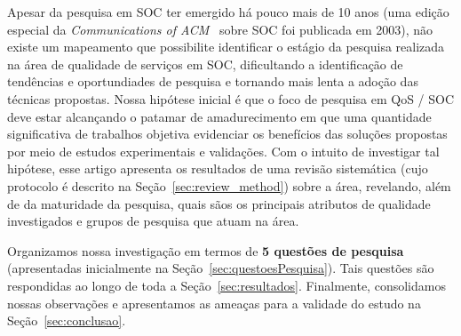 Apesar da pesquisa em SOC ter emergido h\'{a} pouco mais de 10 anos 
(uma edi\c c\~{a}o especial da \emph{Communications of ACM}~\cite{papazoglou:cacm2003} sobre SOC foi publicada em 2003), 
n\~{a}o existe um mapeamento que possibilite identificar o est\'{a}gio da pesquisa realizada na \'{a}rea de qualidade de 
servi\c cos em SOC, dificultando a identifica\c c\~{a}o de tend\^{e}ncias e oportundiades de pesquisa e tornando mais 
lenta a ado\c c\~{a}o das t\'{e}cnicas propostas. Nossa hip\'{o}tese inicial \'{e} que o foco de pesquisa em QoS / SOC deve 
estar alcan\c cando o patamar de amadurecimento em que uma quantidade significativa de trabalhos objetiva evidenciar os 
benef\'{i}cios das solu\c c\~{o}es propostas por meio de estudos experimentais e valida\c c\~{o}es. Com o intuito de investigar tal hip\'{o}tese, 
esse artigo apresenta os resultados de uma revis\~{a}o sistem\'{a}tica (cujo protocolo \'{e} descrito na Se\c c\~{a}o~\ref{sec:review_method}) 
sobre a \'{a}rea, revelando, al\'{e}m de da maturidade da pesquisa, quais s\~{a}os os principais atributos de qualidade 
investigados e grupos de pesquisa que atuam na \'{a}rea. 

Organizamos nossa investiga\c c\~{a}o em termos de {\bf 5 quest\~{o}es de pesquisa} (apresentadas inicialmente na 
Se\c c\~{a}o~\ref{sec:questoesPesquisa}). Tais quest\~{o}es s\~{a}o respondidas ao longo de toda a Se\c c\~{a}o~\ref{sec:resultados}. 
Finalmente, consolidamos nossas observa\c c\~{o}es e apresentamos as amea\c cas para a validade do estudo na 
Se\c c\~{a}o~\ref{sec:conclusao}. 
 
 



